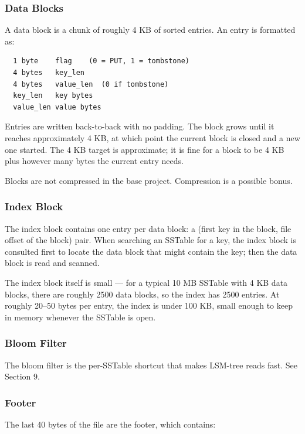 \documentclass[11pt,a4paper]{article}
\begin{document}
\subsubsection{Data Blocks}
A data block is a chunk of roughly 4 KB of sorted entries. An entry is formatted as:

\begin{codebox}
\begin{lstlisting}
  1 byte    flag    (0 = PUT, 1 = tombstone)
  4 bytes   key_len
  4 bytes   value_len  (0 if tombstone)
  key_len   key bytes
  value_len value bytes
\end{lstlisting}
\end{codebox}

Entries are written back-to-back with no padding. The block grows until it reaches approximately 4 KB, at which point the current block is closed and a new one started. The 4 KB target is approximate; it is fine for a block to be 4 KB plus however many bytes the current entry needs.

Blocks are not compressed in the base project. Compression is a possible bonus.

\subsubsection{Index Block}
The index block contains one entry per data block: a (first key in the block, file offset of the block) pair. When searching an SSTable for a key, the index block is consulted first to locate the data block that might contain the key; then the data block is read and scanned.

The index block itself is small --- for a typical 10 MB SSTable with 4 KB data blocks, there are roughly 2500 data blocks, so the index has 2500 entries. At roughly 20--50 bytes per entry, the index is under 100 KB, small enough to keep in memory whenever the SSTable is open.

\subsubsection{Bloom Filter}
The bloom filter is the per-SSTable shortcut that makes LSM-tree reads fast. See Section 9.

\subsubsection{Footer}
The last 40 bytes of the file are the footer, which contains:
\end{document}
